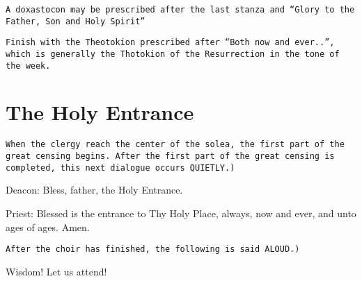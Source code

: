 \documentclass[twoside, letterpaper, 12pt]{report}
\newcommand{\instruction}[1]{%
  \texttt{\scriptsize{#1}}%
}
\newcommand{\centeredsection}[1]{%
  \section*{\centering{}#1}%
}
\begin{document}
\vbox{}
\instruction{A doxastocon may be prescribed after the last stanza and
``Glory to the Father, Son and Holy Spirit''}

\vbox{}
\instruction{Finish with the Theotokion prescribed after ``Both now and ever..'',
which is generally the Thotokion of the Resurrection in the tone of the week.
}
\cleardoublepage

\centeredsection{The Holy Entrance}

\instruction{When the clergy reach the center of the solea,
the first part of the great censing begins. After the first part of the great
censing is completed, this next dialogue occurs QUIETLY.)}

\vbox{}
{
\footnotesize
Deacon: Bless, father, the Holy Entrance.

Priest: Blessed is the entrance to Thy Holy Place, always, now and ever, and unto ages of ages. Amen.
}

\vbox{}
\instruction{After the choir has finished, the following is said ALOUD.)}

\begin{deacon}
\item Wisdom! Let us attend!
\end{deacon}

\end{document}
